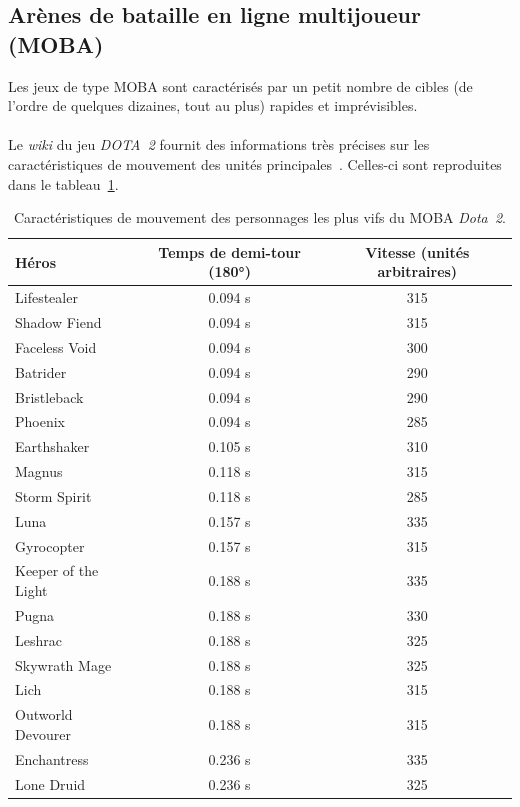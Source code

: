 	\subsection{Arènes de bataille en ligne multijoueur (MOBA)}
	Les jeux de type MOBA sont caractérisés par un petit nombre de cibles (de l'ordre de quelques dizaines, tout au plus) rapides et imprévisibles.

	\paragraph{}
	Le \emph{wiki} du jeu \emph{DOTA~2} fournit des informations très précises sur les caractéristiques de mouvement des unités principales~\cite{dota2}.	 Celles-ci sont reproduites dans le tableau~\ref{tab:dotamoves}.
	
	\newcommand{\newrow}{\bigstrut[t] \\ \hline}
	\begin{table}[ht]
		\centering
		\begin{tabular}{ p{} c c }
		Héros				&	Temps de demi-tour (180°)	&	Vitesse (unités arbitraires)	\newrow
		Lifestealer		&	0.094 s				&	315						\newrow
		Shadow Fiend		&	0.094 s				&	315						\newrow
		Faceless Void		&	0.094 s				&	300						\newrow
		Batrider			&	0.094 s				&	290						\newrow
		Bristleback		&	0.094 s				&	290						\newrow
		Phoenix			&	0.094 s				&	285						\newrow
		Earthshaker		&	0.105 s				&	310						\newrow
		Magnus			&	0.118 s				&	315						\newrow
		Storm Spirit		&	0.118 s				&	285						\newrow
		Luna				&	0.157 s				&	335						\newrow
		Gyrocopter			&	0.157 s				&	315						\newrow
		Keeper of the Light	&	0.188 s				&	335						\newrow
		Pugna				&	0.188 s				&	330						\newrow
		Leshrac			&	0.188 s				&	325						\newrow
		Skywrath Mage		&	0.188 s				&	325						\newrow
		Lich				&	0.188 s				&	315						\newrow
		Outworld Devourer	&	0.188 s				&	315						\newrow
		Enchantress		&	0.236 s				&	335						\newrow
		Lone Druid			&	0.236 s				&	325						\bigstrut[t] \\
		\end{tabular}
		\caption{Caractéristiques de mouvement des personnages les plus vifs du MOBA \emph{Dota~2}.}
		\label{tab:dotamoves}
	\end{table}
	
